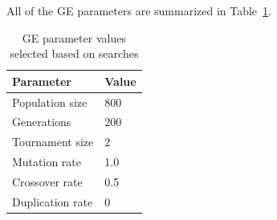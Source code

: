 All of the GE parameters are summarized in Table~\ref{tab:ge-parameters}.

\begin{table}
    \centering
    \begin{tabular}{| l | l |}
    \hline
    \textbf{Parameter} & \textbf{Value} \\ \hline
    Population size & 800 \\
    \hline
    Generations & 200 \\
    \hline
    Tournament size & 2 \\
    \hline
    Mutation rate & 1.0 \\
    \hline
    Crossover rate & 0.5 \\
    \hline
    Duplication rate & 0 \\
    \hline
    \end{tabular}
    \caption{GE parameter values selected based on searches}
    \label{tab:ge-parameters}
\end{table}

